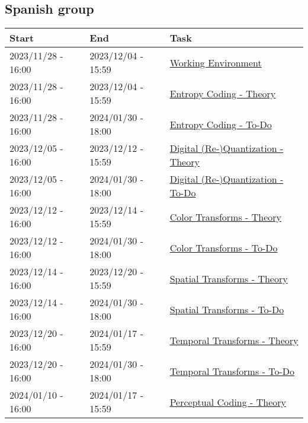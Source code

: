 \subsection{Spanish group}
\begin{tabular}{|l|l|l|}
  \hline
  Start & End & Task \\
  \hline
  2023/11/28 - 16:00 & 2023/12/04 - 15:59 & \href{https://sistemas-multimedia.github.io/contents/working_environment/}{Working Environment} \\
  2023/11/28 - 16:00 & 2023/12/04 - 15:59 & \href{https://sistemas-multimedia.github.io/contents/entropy_coding/}{Entropy Coding - Theory} \\
  2023/11/28 - 16:00 & 2024/01/30 - 18:00 & \href{https://sistemas-multimedia.github.io/contents/entropy_coding/#x1-110007}{Entropy Coding - To-Do} \\
  2023/12/05 - 16:00 & 2023/12/12 - 15:59 & \href{https://sistemas-multimedia.github.io/contents/quantization/}{Digital (Re-)Quantization - Theory} \\
  2023/12/05 - 16:00 & 2024/01/30 - 18:00 & \href{https://sistemas-multimedia.github.io/contents/quantization/#x1-150008}{Digital (Re-)Quantization - To-Do} \\
  2023/12/12 - 16:00 & 2023/12/14 - 15:59 & \href{https://sistemas-multimedia.github.io/contents/color_transforms/}{Color Transforms - Theory} \\
  2023/12/12 - 16:00 & 2024/01/30 - 18:00 & \href{https://sistemas-multimedia.github.io/contents/color_transforms/#x1-100006}{Color Transforms - To-Do} \\
  2023/12/14 - 16:00 & 2023/12/20 - 15:59 & \href{https://sistemas-multimedia.github.io/contents/spatial_transforms/}{Spatial Transforms - Theory} \\
  2023/12/14 - 16:00 & 2024/01/30 - 18:00 & \href{https://sistemas-multimedia.github.io/contents/spatial_transforms/#x1-80006}{Spatial Transforms - To-Do} \\
  2023/12/20 - 16:00 & 2024/01/17 - 15:59 & \href{https://sistemas-multimedia.github.io/contents/temporal_transforms/}{Temporal Transforms - Theory} \\
  2023/12/20 - 16:00 & 2024/01/30 - 18:00 & \href{https://sistemas-multimedia.github.io/contents/temporal_transforms/#x1-90008}{Temporal Transforms - To-Do} \\
  2024/01/10 - 16:00 & 2024/01/17 - 15:59 & \href{https://sistemas-multimedia.github.io/contents/perceptual_coding/}{Perceptual Coding - Theory} \\

\end{tabular}
